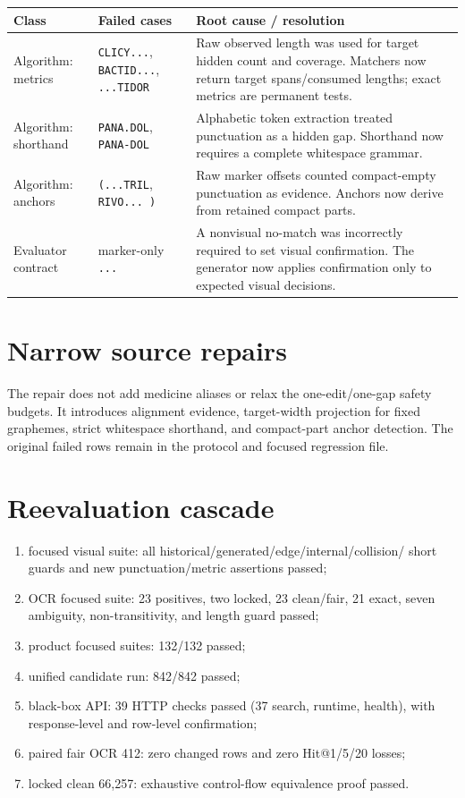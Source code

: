 \documentclass[10pt,oneside]{book}
\begin{document}
\begin{longtable}{@{}p{1.45in}p{2.2in}p{2.75in}@{}}
\toprule
Class & Failed cases & Root cause / resolution \\
\midrule
Algorithm: metrics & \texttt{CLICY...}, \texttt{BACTID...}, \texttt{...TIDOR} & Raw observed length was used for target hidden count and coverage. Matchers now return target spans/consumed lengths; exact metrics are permanent tests. \\
Algorithm: shorthand & \texttt{PANA.DOL}, \texttt{PANA-DOL} & Alphabetic token extraction treated punctuation as a hidden gap. Shorthand now requires a complete whitespace grammar. \\
Algorithm: anchors & \texttt{(...TRIL}, \texttt{RIVO... )} & Raw marker offsets counted compact-empty punctuation as evidence. Anchors now derive from retained compact parts. \\
Evaluator contract & marker-only \texttt{...} & A nonvisual no-match was incorrectly required to set visual confirmation. The generator now applies confirmation only to expected visual decisions. \\
\bottomrule
\end{longtable}

\section{Narrow source repairs}

The repair does not add medicine aliases or relax the one-edit/one-gap safety
budgets. It introduces alignment evidence, target-width projection for fixed
graphemes, strict whitespace shorthand, and compact-part anchor detection. The
original failed rows remain in the protocol and focused regression file.

\section{Reevaluation cascade}

\begin{enumerate}
\item focused visual suite: all historical/generated/edge/internal/collision/
short guards and new punctuation/metric assertions passed;
\item OCR focused suite: 23 positives, two locked, 23 clean/fair, 21 exact,
seven ambiguity, non-transitivity, and length guard passed;
\item product focused suites: 132/132 passed;
\item unified candidate run: 842/842 passed;
\item black-box API: 39 HTTP checks passed (37 search, runtime, health), with
response-level and row-level confirmation;
\item paired fair OCR 412: zero changed rows and zero Hit@1/5/20 losses;
\item locked clean 66,257: exhaustive control-flow equivalence proof passed.
\end{enumerate}
\end{document}
